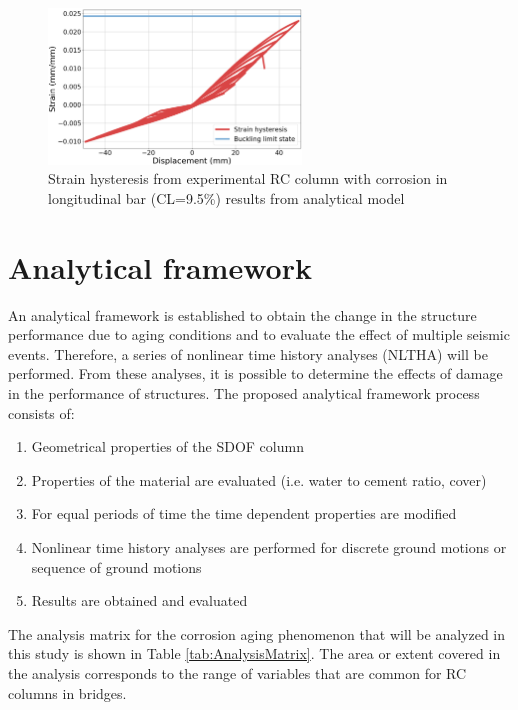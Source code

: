 \begin{figure}[htbp]
	\centering
	\includegraphics[width=0.6\textwidth]{Chapter-5/figs/MaEtAl_StrainHisteresis}
	\caption{Strain hysteresis from experimental RC column with corrosion in longitudinal bar (CL=9.5\%) results from analytical model}
	\label{fig:ModelCalibration_Corrosion_Hysteresis}
\end{figure}
\newpage
\section{Analytical framework}

An analytical framework is established to obtain the change in the structure performance due to aging conditions and to evaluate the effect of multiple seismic events. Therefore, a series of nonlinear time history analyses (NLTHA) will be performed. From these analyses, it is possible to determine the effects of damage in the performance of structures. The proposed analytical framework process consists of:

\begin{enumerate}
	\item Geometrical properties of the SDOF column 
	\item Properties of the material are evaluated (i.e. water to cement ratio, cover)
	\item For equal periods of time the time dependent properties are modified
	\item Nonlinear time history analyses are performed for discrete ground motions or sequence of ground motions
	\item Results are obtained and evaluated
\end{enumerate}

The analysis matrix for the corrosion aging phenomenon that will be analyzed in this study is shown in Table \ref{tab:AnalysisMatrix}. The area or extent covered in the analysis corresponds to the range of variables that are common for RC columns in bridges.

